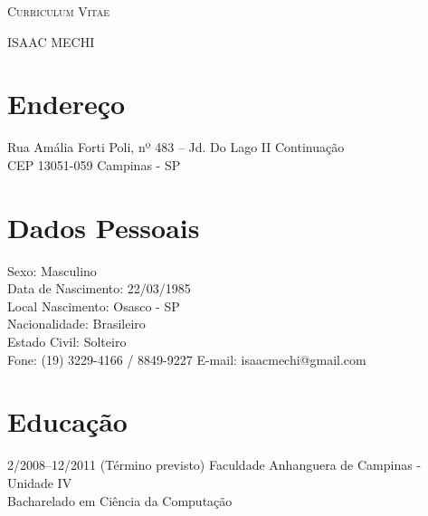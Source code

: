 \documentclass[a4paper]{article}
\begin{document}
\pagestyle{empty}

\begin{center}
\huge{\textsc{Curriculum Vitae}}
\vspace{\baselineskip}

\Large{\textsc{ISAAC MECHI}}
\end{center}
\vspace{1.5\baselineskip}

\section{Endereço}

\begin{flushleft}
	Rua Amália Forti Poli, nº 483 – Jd. Do Lago II Continuação \\
	CEP 13051-059 Campinas - SP
\end{flushleft}


\section{Dados Pessoais}
\begin{flushleft}
  Sexo: Masculino \\
  Data de Nascimento: 22/03/1985 \\
  Local Nascimento: Osasco - SP \\
  Nacionalidade: Brasileiro \\
  Estado Civil: Solteiro \\
  Fone: (19) 3229-4166 / 8849-9227 E-mail: isaacmechi@gmail.com \\
\end{flushleft}


\section{Educação}
\begin{CV}
\item[2/2008--12/2011 (Término previsto)] Faculdade Anhanguera de Campinas - Unidade IV
\\Bacharelado em Ciência da Computação
\end{CV}
\end{document}
